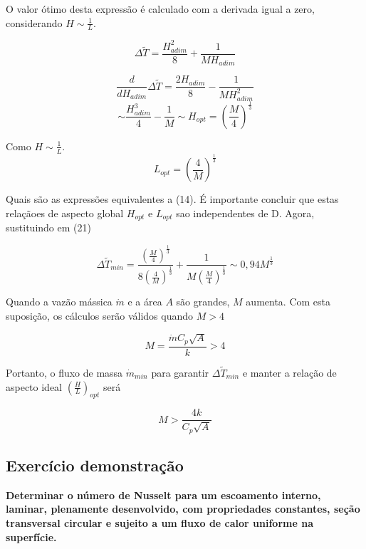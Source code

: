 \documentclass[12pt]{article}
\begin{document}
O valor ótimo desta expressão é calculado com a derivada igual a zero, considerando $H\sim \frac{1}{L}$.

\begin{equation}
	\Delta \widetilde{T} = \frac{H_{adim}^{2}}{8} + \frac{1}{MH_{adim}}
\end{equation}

\begin{equation}
	\frac{d}{dH_{adim}}\Delta \widetilde{T} = \frac{2H_{adim}}{8} - \frac{1}{MH_{adim}^{2}}
\end{equation}
\begin{equation}
	 \sim \frac{H_{adim}^{3}}{4} - \frac{1}{M} \sim H_{opt} = \left( \frac{M}{4}\right) ^{\frac{1}{3}}
\end{equation}

Como $H\sim \frac{1}{L}$.
\begin{equation}
	L_{opt} = \left( \frac{4}{M}\right) ^{\frac{1}{3}}
\end{equation}

Quais são as expressões equivalentes a (14). É importante concluir que estas relaçãoes de aspecto global $H_{opt}$ e $L_{opt}$ sao independentes de D.  Agora, sustituindo em (21)



\begin{equation}
	\Delta \widetilde{T}_{min} = \frac{\left( \frac{M}{4}\right) ^{\frac{1}{3}}}{8\left( \frac{4}{M}\right) ^{\frac{1}{3}}} + \frac{1}{M\left( \frac{M}{4}\right) ^{\frac{1}{3}}} \sim 0,94 M^{\frac{1}{3}}
\end{equation}

Quando a vazão mássica $\dot{m}$ e a área $A$ são grandes, $M$ aumenta. Com esta suposição, os cálculos serão válidos quando $M > 4$



\begin{equation}
	M = \frac{\dot{m} C_{p} \sqrt{A}}{k} > 4
\end{equation}

Portanto, o fluxo de massa $\dot{m}_{min}$ para garantir $\Delta \widetilde{T}_{min}$ e manter a relação de aspecto ideal $\left( \frac{H}{L}\right)_{opt} $ será

\begin{equation}
	M > \frac{4k}{C_{p}\sqrt{A}}
\end{equation}


\subsection*{Exercício demonstração}
\textbf{Determinar o número de Nusselt para um escoamento interno, laminar, plenamente desenvolvido, com propriedades constantes, seção transversal circular e sujeito a um fluxo de calor uniforme na superfície.}\\
\end{document}
